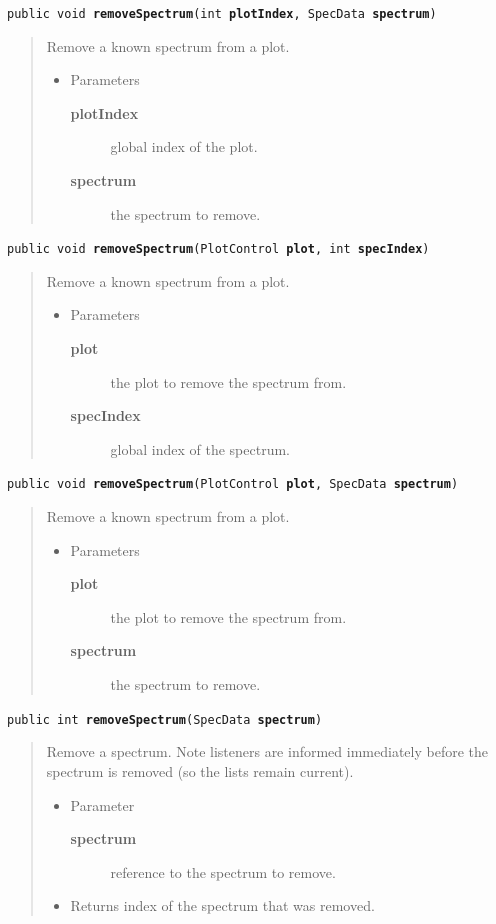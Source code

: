 \documentclass[twoside,11pt]{article}
\renewcommand{\_}{\texttt{\symbol{95}}}
\newcommand{\method}[1]{\texttt{#1}}
\newenvironment{desc}{\begin{quote}}{\end{quote}}
\begin{document}
\method{public void \textbf{removeSpectrum}(\texttt{int} \textbf{plotIndex}, \texttt{SpecData} \textbf{spectrum})\label{l315}\label{l316}}
\begin{desc}Remove a known spectrum from a plot.
\begin{itemize}
\item{Parameters
  \begin{description}
   \item[\textbf{plotIndex}]{global index of the plot.}
   \item[\textbf{spectrum}]{the spectrum to remove.}
  \end{description}}
\end{itemize}
\end{desc}

\method{public void \textbf{removeSpectrum}(\texttt{PlotControl} \textbf{plot}, \texttt{int} \textbf{specIndex})\label{l317}\label{l318}}
\begin{desc}Remove a known spectrum from a plot.
\begin{itemize}
\item{Parameters
  \begin{description}
   \item[\textbf{plot}]{the plot to remove the spectrum from.}
   \item[\textbf{specIndex}]{global index of the spectrum.}
  \end{description}}
\end{itemize}
\end{desc}

\method{public void \textbf{removeSpectrum}(\texttt{PlotControl} \textbf{plot}, \texttt{SpecData} \textbf{spectrum})\label{l319}\label{l320}}
\begin{desc}Remove a known spectrum from a plot.
\begin{itemize}
\item{Parameters
  \begin{description}
   \item[\textbf{plot}]{the plot to remove the spectrum from.}
   \item[\textbf{spectrum}]{the spectrum to remove.}
  \end{description}}
\end{itemize}
\end{desc}

\method{public int \textbf{removeSpectrum}(\texttt{SpecData} \textbf{spectrum})\label{l321}\label{l322}}
\begin{desc}Remove a spectrum. Note listeners are informed immediately
  before the spectrum is removed (so the lists remain current).
\begin{itemize}
\item{Parameter
  \begin{description}
   \item[\textbf{spectrum}]{reference to the spectrum to remove.}
  \end{description}}
\end{itemize}
\begin{itemize}
\item{Returns index of the spectrum that was removed. }
\end{itemize}
\end{desc}
\end{document}
